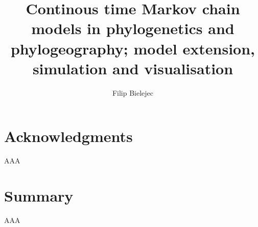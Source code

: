\documentclass[12pt,twoside]{mitthesis}
\theoremstyle{plain}
\theoremstyle{definition}
\theoremstyle{remark}
\begin{document}





\title{Continous time Markov chain models in phylogenetics and phylogeography; model extension, simulation and visualisation}

\author{Filip Bielejec}





\thesisdate{\today}

\maketitle

\section*{Acknowledgments}

AAA



\tableofcontents
\pagebreak{}


\setcounter{page}{1}

\section{Summary}

AAA

\end{document}
